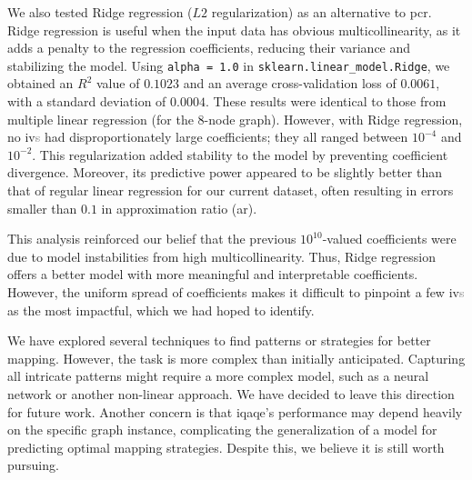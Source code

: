 We also tested Ridge regression ($L2$ regularization) as an alternative to \acrshort{pcr}. Ridge regression is useful when the input data has obvious multicollinearity, as it adds a penalty to the regression coefficients, reducing their variance and stabilizing the model. Using \texttt{alpha = 1.0} in \texttt{sklearn.linear\_model.Ridge}, we obtained an \(R^2\) value of $0.1023$ and an average cross-validation loss of $0.0061$, with a standard deviation of $0.0004$. These results were identical to those from multiple linear regression (for the $8$-node graph). However, with Ridge regression, no \acrshort{iv}\textcolor{gray}{s} had disproportionately large coefficients; they all ranged between \(10^{-4}\) and \(10^{-2}\). This regularization added stability to the model by preventing coefficient divergence. Moreover, its predictive power appeared to be slightly better than that of regular linear regression for our current dataset, often resulting in errors smaller than $0.1$ in approximation ratio (\acrshort{ar}).

This analysis reinforced our belief that the previous \(10^{10}\)-valued coefficients were due to model instabilities from high multicollinearity. Thus, Ridge regression offers a better model with more meaningful and interpretable coefficients. However, the uniform spread of coefficients makes it difficult to pinpoint a few \acrshort{iv}\textcolor{gray}{s} as the most impactful, which we had hoped to identify.

We have explored several techniques to find patterns or strategies for better mapping. However, the task is more complex than initially anticipated. Capturing all intricate patterns might require a more complex model, such as a neural network or another non-linear approach. We have decided to leave this direction for future work. Another concern is that \acrshort{iqaqe}'s performance may depend heavily on the specific graph instance, complicating the generalization of a model for predicting optimal mapping strategies. Despite this, we believe it is still worth pursuing.



